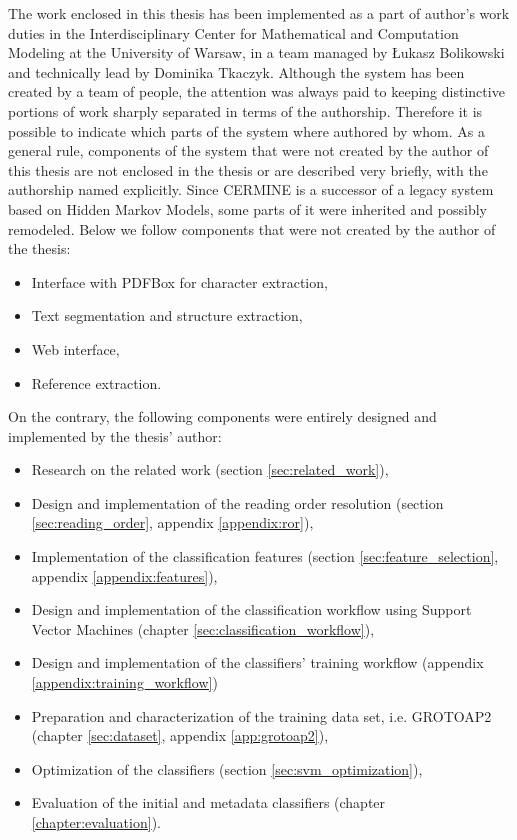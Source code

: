 The work enclosed in this thesis has been implemented as a part of author's work duties in the Interdisciplinary Center for Mathematical and Computation Modeling at the University of Warsaw, in a team managed by Łukasz Bolikowski and technically lead by Dominika Tkaczyk. Although the system has been created by a team of people, the attention was always paid to keeping distinctive portions of work sharply separated in terms of the authorship. Therefore it is possible to indicate which parts of the system where authored by whom. As a general rule, components of the system that were not created by the author of this thesis are not enclosed in the thesis or are described very briefly, with the authorship named explicitly. Since CERMINE is a successor of a legacy system based on Hidden Markov Models, some parts of it were inherited and possibly remodeled. Below we follow components that were not created by the author of the thesis:
\begin{itemize}
\item Interface with PDFBox for character extraction,
\item Text segmentation and structure extraction,
\item Web interface,
\item Reference extraction.
\end{itemize}

On the contrary, the following components were entirely designed and implemented by the thesis' author:
\begin{itemize}
\item Research on the related work (section \ref{sec:related_work}),
\item Design and implementation of the reading order resolution (section \ref{sec:reading_order}, appendix \ref{appendix:ror}),
\item Implementation of the classification features (section \ref{sec:feature_selection}, appendix \ref{appendix:features}),
\item Design and implementation of the classification workflow using Support Vector Machines (chapter \ref{sec:classification_workflow}),
\item Design and implementation of the classifiers' training workflow (appendix \ref{appendix:training_workflow})
\item Preparation and characterization of the training data set, i.e. GROTOAP2 (chapter \ref{sec:dataset}, appendix \ref{app:grotoap2}),
\item Optimization of the classifiers (section \ref{sec:svm_optimization}),
\item Evaluation of the initial and metadata classifiers (chapter \ref{chapter:evaluation}).
\end{itemize}

